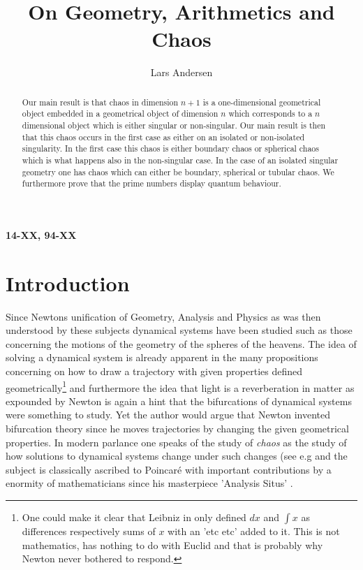 \documentclass[10pt,a4paper]{amsart}
\title{On Geometry, Arithmetics and Chaos}
\author{Lars Andersen}
\begin{document}
\begin{abstract}
Our main result is that chaos in dimension $n+1$ is a one-dimensional geometrical object embedded in a geometrical object of dimension $n$ which corresponds to a $n$ dimensional object which is either singular or non-singular. Our main result is then that this chaos occurs in the first case as either on an isolated or non-isolated singularity. In the first case this chaos is either boundary chaos or spherical chaos which is what happens also in the non-singular case. In the case of an isolated singular geometry one has chaos which can either be boundary, spherical or tubular chaos. We furthermore prove that the prime numbers display quantum behaviour. 
\end{abstract}

\begin{center}
    

\maketitle

\tableofcontents

\textbf{14-XX, 94-XX}
\end{center}



\section{Introduction}

Since Newtons unification \cite{newton} of Geometry, Analysis and Physics as was then understood by these subjects dynamical systems have been studied such as those concerning the motions of the geometry of the spheres of the heavens. The idea of solving a dynamical system is already apparent in the many propositions concerning on how to draw a trajectory with given properties defined geometrically\footnote{One could make it clear that Leibniz in \cite{Leibniz1} only defined $dx$ and $\int x$ as differences respectively sums of $x$ with an 'etc etc' added to it. This is not mathematics, has nothing to do with Euclid and that is probably why Newton never bothered to respond.}
and furthermore the idea that light is a reverberation in matter as expounded by Newton \cite{newtonoptica} is again a hint that the bifurcations of dynamical systems were something to study. Yet the author would argue that Newton invented bifurcation theory since he moves trajectories by changing the given geometrical properties. In modern parlance one speaks of the study of \emph{chaos} as the study of how solutions to dynamical systems change under such changes (see e.g \cite{Poincare} and the subject is classically ascribed to Poincaré with important contributions by a enormity of mathematicians since his masterpiece 'Analysis Situs' \cite{Poincare}.\\
\end{document}
